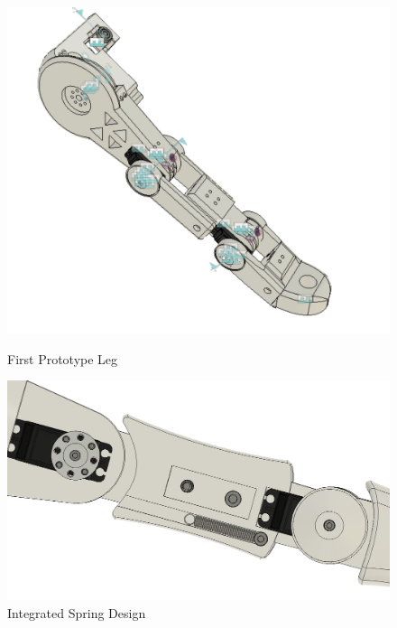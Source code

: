        \begin{figure}[H]
          \centering
          \begin{minipage}[b]{0.4\textwidth}
            \includegraphics[width=\textwidth]{figures/PrototypeLeg1.PNG}
            \caption{First Prototype Leg}
            \label{fig:FirstPrototypeLeg}
          \end{minipage}
          \hfill
          \begin{minipage}[b]{0.4\textwidth}
            \includegraphics[width=\textwidth]{figures/IntegratedSpring.png}
            \caption{Integrated Spring Design}
            \label{fig:IntegratedSpringDesign}
          \end{minipage}
        \end{figure}
        
